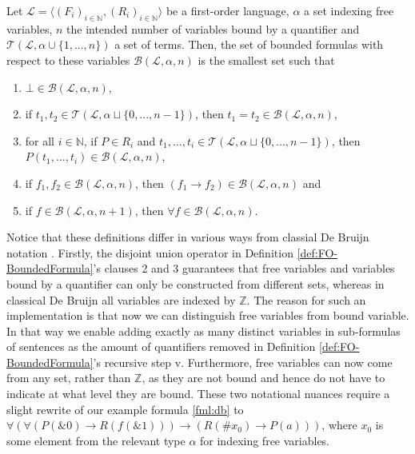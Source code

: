 \begin{definition}\label{def:FO-BoundedFormula}
  \leanok
    Let $\mathcal{L} = \langle (F_i)_{i \in \mathbb{N}}, (R_i)_{i \in \mathbb{N}} \rangle$ be a first-order language, $\alpha$ a set indexing free variables, $n$ the intended number of variables bound by a quantifier and $\mathcal{T}(\mathcal{L}, \alpha \cup \{1,...,n\})$ a set of terms. Then, the set of bounded formulas with respect to these variables $\mathcal{B}(\mathcal{L},\alpha,n)$ is the smallest set such that
    \begin{enumerate}
        \item $\bot \in \mathcal{B}(\mathcal{L},\alpha,n)$,
        \item if $t_1,t_2 \in \mathcal{T}(\mathcal{L}, \alpha \sqcup \{0,...,n-1\})$, then $t_1 = t_2 \in \mathcal{B}(\mathcal{L},\alpha,n)$,
        \item for all $i \in \mathbb{N}$, if $P \in R_i$ and $t_1,...,t_i \in \mathcal{T}(\mathcal{L}, \alpha \sqcup \{0,...,n-1\})$, then $P(t_1,...,t_i) \in \mathcal{B}(\mathcal{L},\alpha,n)$,
        \item if $f_1,f_2 \in \mathcal{B}(\mathcal{L},\alpha,n)$, then $(f_1 \rightarrow f_2) \in \mathcal{B}(\mathcal{L},\alpha,n)$ and
        \item if $f \in \mathcal{B}(\mathcal{L},\alpha,n+1)$, then $\forall f \in \mathcal{B}(\mathcal{L},\alpha,n)$.
    \end{enumerate}
\end{definition}
Notice that these definitions differ in various ways from classial De Bruijn notation \cite{bruijn:1972}. Firstly, the disjoint union operator in Definition \ref{def:FO-BoundedFormula}'s clauses 2 and 3 guarantees that free variables and variables bound by a quantifier can only be constructed from different sets, whereas in classical De Bruijn all variables are indexed by $\mathbb{Z}$. The reason for such an implementation is that now we can distinguish free variables from bound variable. In that way we enable adding exactly as many distinct variables in sub-formulas of sentences as the amount of quantifiers removed in Definition \ref{def:FO-BoundedFormula}'s recursive step v. Furthermore, free variables can now come from any set, rather than $\mathbb{Z}$, as they are not bound and hence do not have to indicate at what level they are bound. These two notational nuances require a slight rewrite of our example formula \ref{fml:db} to $\forall (\forall(P(\&0) \rightarrow R(f(\&1))) \to (R(\#x_0) \to P(a)))$, where $x_0$ is some element from the relevant type $\alpha$ for indexing free variables.

